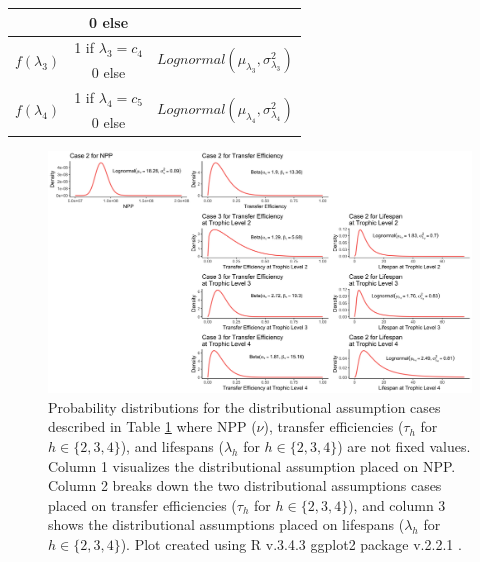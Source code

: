 \documentclass[oneside,12pt,final]{sty/ucthesis-CA2012}
\let\cite\citep                             %
\begin{document}
\begin{mainmatter}
\begin{table}[H]
\begin{tabular}{|c|c|c|c|}
    	& 0 else	& 	\multicolumn{2}{c|}{ }  \\
   \hline      	
    \multirow{2}{*}{$f(\lambda_3)$} & 1 if $\lambda_3 = c_4$ & \multicolumn{2}{c|}{\multirow{2}{*}{$Lognormal(\mu_{\lambda_3}, \sigma_{\lambda_3}^2)$}} \\
    	& 0 else	& 	\multicolumn{2}{c|}{ }  \\
   \hline      	
    \multirow{2}{*}{$f(\lambda_4)$} & 1 if $\lambda_4 = c_5$ & \multicolumn{2}{c|}{\multirow{2}{*}{$Lognormal(\mu_{\lambda_4}, \sigma_{\lambda_4}^2)$}} \\
    	& 0 else	& 	\multicolumn{2}{c|}{ }  \\    	
   \hline
\end{tabular} 
\label{assumcases}
\end{table}

\begin{figure}[H]
     \centering
       \includegraphics[width=\textwidth]{fig/distassump_v2}
    \caption{Probability distributions for the distributional assumption cases described in Table \ref{assumcases} where NPP ($\nu$), transfer efficiencies ($\tau_h$ for $h \in \{2, 3, 4\}$), and lifespans ($\lambda_h$ for $h \in \{2, 3, 4\}$) are not fixed values. Column 1 visualizes the distributional assumption placed on NPP. Column 2 breaks down the two distributional assumptions cases placed on transfer efficiencies ($\tau_h$ for $h \in \{2, 3, 4\}$), and column 3 shows the distributional assumptions placed on lifespans ($\lambda_h$ for $h \in \{2, 3, 4\}$). Plot created using R v.3.4.3 \cite{Rcite} ggplot2 package v.2.2.1 \cite{ggplot}. }
    \label{distassump}
\end{figure}


\end{mainmatter}
\end{document}
